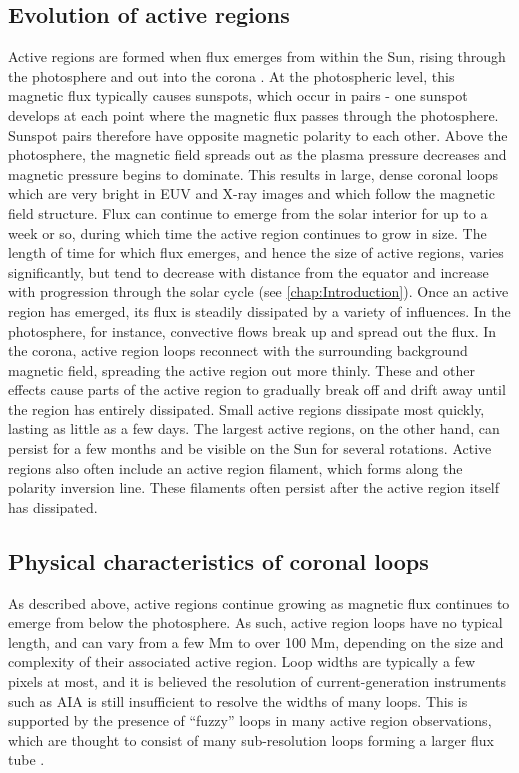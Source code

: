 \documentclass{article}
\begin{document}
\subsection{Evolution of active regions}
Active regions are formed when flux emerges from within the Sun, rising
through the photosphere and out into the corona \citep{Moreno-Insertis1997}.
At the photospheric level, this magnetic flux typically causes sunspots,
which occur in pairs - one sunspot develops at each point where the
magnetic flux passes through the photosphere. Sunspot pairs therefore
have opposite magnetic polarity to each other. Above the photosphere,
the magnetic field spreads out as the plasma pressure decreases and
magnetic pressure begins to dominate. This results in large, dense
coronal loops which are very bright in EUV and X-ray images and which
follow the magnetic field structure. Flux can continue to emerge from
the solar interior for up to a week or so, during which time the active
region continues to grow in size. The length of time for which flux
emerges, and hence the size of active regions, varies significantly,
but tend to decrease with distance from the equator and increase with
progression through the solar cycle (see \ref{chap:Introduction}).
Once an active region has emerged, its flux is steadily dissipated
by a variety of influences. In the photosphere, for instance, convective
flows break up and spread out the flux. In the corona, active region
loops reconnect with the surrounding background magnetic field, spreading
the active region out more thinly. These and other effects cause parts
of the active region to gradually break off and drift away until the
region has entirely dissipated. Small active regions dissipate most
quickly, lasting as little as a few days. The largest active regions,
on the other hand, can persist for a few months and be visible on
the Sun for several rotations. Active regions also often include an
active region filament, which forms along the polarity inversion line.
These filaments often persist after the active region itself has dissipated.

\subsection{Physical characteristics of coronal loops}
As described above, active regions continue growing as magnetic flux
continues to emerge from below the photosphere. As such, active region
loops have no typical length, and can vary from a few Mm to over 100
Mm, depending on the size and complexity of their associated active
region. Loop widths are typically a few pixels at most, and it is
believed the resolution of current-generation instruments such as
AIA is still insufficient to resolve the widths of many loops. This
is supported by the presence of ``fuzzy'' loops in many active region
observations, which are thought to consist of many sub-resolution
loops forming a larger flux tube \citep{Klimchuk2006}.
\end{document}
